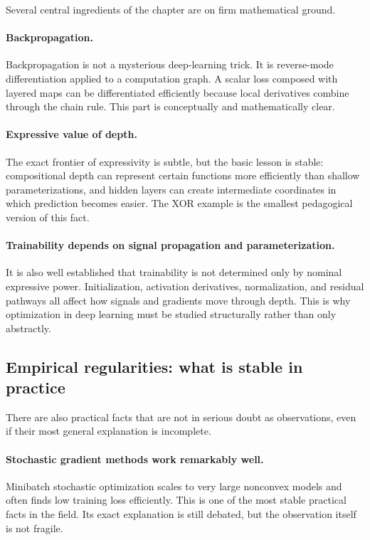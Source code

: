 Several central ingredients of the chapter are on firm mathematical ground.

\paragraph{Backpropagation.}
Backpropagation is not a mysterious deep-learning trick.
It is reverse-mode differentiation applied to a computation graph.
A scalar loss composed with layered maps can be differentiated efficiently because local derivatives combine through the chain rule.
This part is conceptually and mathematically clear.

\paragraph{Expressive value of depth.}
The exact frontier of expressivity is subtle, but the basic lesson is stable:
compositional depth can represent certain functions more efficiently than shallow parameterizations,
and hidden layers can create intermediate coordinates in which prediction becomes easier.
The XOR example is the smallest pedagogical version of this fact.

\paragraph{Trainability depends on signal propagation and parameterization.}
It is also well established that trainability is not determined only by nominal expressive power.
Initialization, activation derivatives, normalization, and residual pathways all affect how signals and gradients move through depth.
This is why optimization in deep learning must be studied structurally rather than only abstractly.

\subsection*{Empirical regularities: what is stable in practice}

There are also practical facts that are not in serious doubt as observations, even if their most general explanation is incomplete.

\paragraph{Stochastic gradient methods work remarkably well.}
Minibatch stochastic optimization scales to very large nonconvex models and often finds low training loss efficiently.
This is one of the most stable practical facts in the field.
Its exact explanation is still debated, but the observation itself is not fragile.

